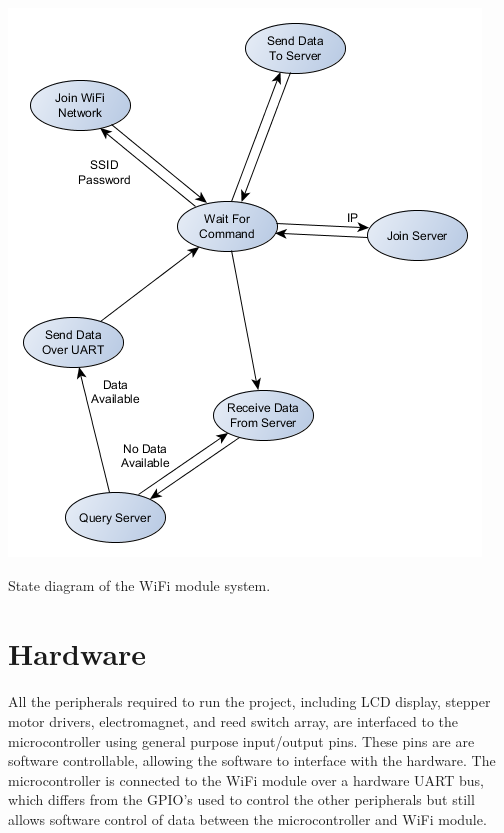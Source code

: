 \documentclass{article}
\begin{document}
\centerline{\includegraphics[scale=.5]{WiFi_Module_State}}

\begin{center}
State diagram of the WiFi module system.
\end{center}

\vspace*{5mm}

\section*{Hardware}
\indent

All the peripherals required to run the project, including LCD display, stepper motor drivers, electromagnet, and reed switch array, are interfaced to the microcontroller using general purpose input/output pins. These pins are are software controllable, allowing the software to interface with the hardware. The microcontroller is connected to the WiFi module over a hardware UART bus, which differs from the GPIO's used to control the other peripherals but still allows software control of data between the microcontroller and WiFi module.

\vspace*{5mm}
\end{document}
